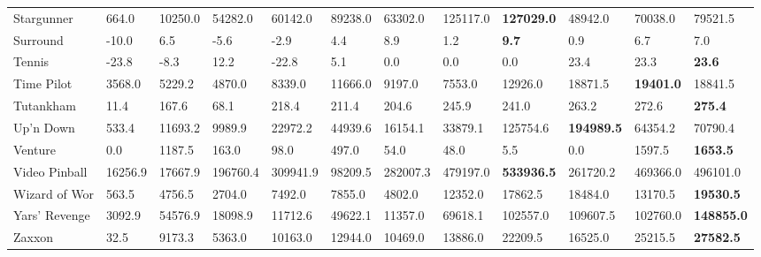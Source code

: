 \documentclass{article}
\begin{document}
\begin{table}[h]
\begin{scriptsize}
\begin{sc}
\begin{tabular}{| p{2.4cm} p{0.84cm} p{0.84cm} p{0.84cm} p{0.84cm} p{0.84cm} p{0.84cm} p{0.84cm} p{0.84cm} p{0.84cm} p{0.84cm} p{0.84cm} |}
Stargunner & 664.0 & 10250.0 & 54282.0 & 60142.0 & 89238.0 & 63302.0 & 125117.0 & {\bf 127029.0} & 48942.0 & 70038.0 & 79521.5\\
Surround & -10.0 & 6.5 & -5.6 & -2.9 & 4.4 & 8.9 & 1.2 & {\bf 9.7} & 0.9 & 6.7 & 7.0\\
Tennis & -23.8 & -8.3 & 12.2 & -22.8 & 5.1 & 0.0 & 0.0 & 0.0 & 23.4 & 23.3 & {\bf 23.6}\\
Time Pilot & 3568.0 & 5229.2 & 4870.0 & 8339.0 & 11666.0 & 9197.0 & 7553.0 & 12926.0 & 18871.5 & {\bf 19401.0} & 18841.5\\
Tutankham & 11.4 & 167.6 & 68.1 & 218.4 & 211.4 & 204.6 & 245.9 & 241.0 & 263.2 & 272.6 & {\bf 275.4}\\
Up'n Down & 533.4 & 11693.2 & 9989.9 & 22972.2 & 44939.6 & 16154.1 & 33879.1 & 125754.6 & {\bf 194989.5} & 64354.2 & 70790.4\\
Venture & 0.0 & 1187.5 & 163.0 & 98.0 & 497.0 & 54.0 & 48.0 & 5.5 & 0.0 & 1597.5 & {\bf 1653.5}\\
Video Pinball & 16256.9 & 17667.9 & 196760.4 & 309941.9 & 98209.5 & 282007.3 & 479197.0 & {\bf 533936.5} & 261720.2 & 469366.0 & 496101.0\\
Wizard of Wor & 563.5 & 4756.5 & 2704.0 & 7492.0 & 7855.0 & 4802.0 & 12352.0 & 17862.5 & 18484.0 & 13170.5 & {\bf 19530.5}\\
Yars' Revenge & 3092.9 & 54576.9 & 18098.9 & 11712.6 & 49622.1 & 11357.0 & 69618.1 & 102557.0 & 109607.5 & 102760.0 & {\bf 148855.0}\\
Zaxxon & 32.5 & 9173.3 & 5363.0 & 10163.0 & 12944.0 & 10469.0 & 13886.0 & 22209.5 & 16525.0 & 25215.5 & {\bf 27582.5}\\
\hline
\end{tabular}
\clearpage{}
\end{sc}
\end{scriptsize}
\end{table}
\end{document}
